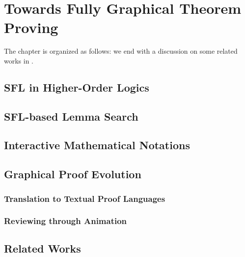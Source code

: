 \setchapterpreamble[u]{\margintoc}
\chapter{Towards Fully Graphical Theorem Proving}

The chapter is organized as follows: we end with a discussion on some related
works in .

\section{SFL in Higher-Order Logics}

\section{SFL-based Lemma Search}

\section{Interactive Mathematical Notations}

\section{Graphical Proof Evolution}

\subsection{Translation to Textual Proof Languages}

\subsection{Reviewing through Animation}

\section{Related Works}




